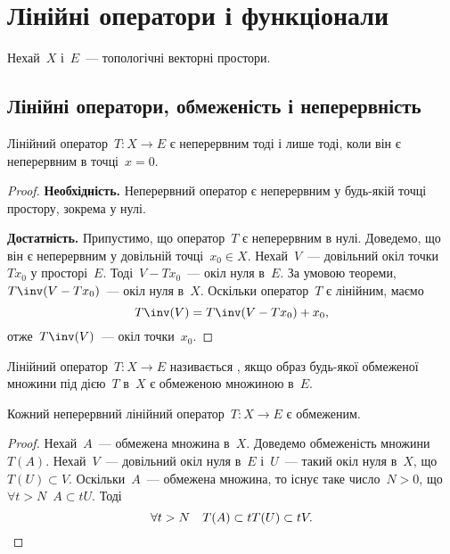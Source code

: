 \chapter{Лінійні оператори і функціонали}

Нехай~$X$ і~$E$~--- топологічні векторні простори.

\section{Лінійні оператори, обмеженість і неперервність}

\begin{theorem}
    \label{th:linear-continuous-functional-is-continuous-at-zero}
    Лінійний оператор~$T: X \to E$ є неперервним тоді і лише тоді, коли він є неперервним в точці~$x = 0$.
\end{theorem}

\begin{proof}
    \textbf{Необхідність.} Неперервний оператор є неперервним у будь-якій точці простору, зокрема у нулі.

    \textbf{Достатність.} Припустимо, що оператор~$T$ є неперервним в нулі. Доведемо, що він є неперервним у довільній точці~$x_0 \in X$. Нехай~$V$~--- довільний окіл точки~$T x_0$ у просторі~$E$. Тоді~$V - T x_0$~--- окіл нуля в~$E$. За умовою теореми,~$T\inv(V - T x_0)$~--- окіл нуля в~$X$. Оскільки оператор~$T$ є лінійним, маємо
    \begin{equation*}
        T\inv(V) = T\inv(V - T x_0) + x_0,
    \end{equation*}
    отже~$T\inv(V)$~--- окіл точки~$x_0$.
\end{proof}

\begin{definition}
    Лінійний оператор~$T: X \to E$ називається , якщо образ будь-якої обмеженої множини під дією~$T$ в~$X$ є обмеженою множиною в~$E$.
\end{definition}

\begin{theorem}
    \label{th:linear-continuous-functional-is-bounded}
    Кожний неперервний лінійний оператор~$T: X \to E$ є обмеженим.
\end{theorem}

\begin{proof}
    Нехай~$A$~--- обмежена множина в~$X$. Доведемо обмеженість множини~$T(A)$. Нехай~$V$~--- довільний окіл нуля в~$E$ і~$U$~--- такий окіл нуля в~$X$, що~$T(U) \subset V$. Оскільки~$A$~--- обмежена множина, то існує таке число~$N > 0$, що~$\forall t > N$~$A \subset t U$. Тоді
    \begin{equation*}
        \forall t > N \quad T(A) \subset t T(U) \subset t V. \qedhere
    \end{equation*}
\end{proof}

